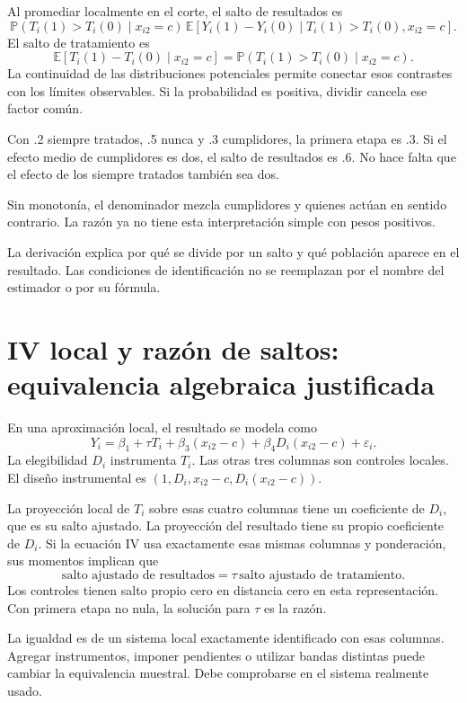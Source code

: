 \documentclass[11pt,a4paper]{article}
\newcommand{\E}{\mathbb E}
\newcommand{\Prob}{\mathbb P}
\begin{document}
Al promediar localmente en el corte,
el salto de resultados es
\[
\Prob(T_i(1)>T_i(0)\mid x_{i2}=c)
\,\E[Y_i(1)-Y_i(0)\mid T_i(1)>T_i(0),x_{i2}=c].
\]
El salto de tratamiento es
\[
\E[T_i(1)-T_i(0)\mid x_{i2}=c]
=\Prob(T_i(1)>T_i(0)\mid x_{i2}=c).
\]
La continuidad de las distribuciones
potenciales permite conectar esos
contrastes con los límites observables.
Si la probabilidad es positiva,
dividir cancela ese factor común.

\begin{ejemplo}[Composición]
Con .2 siempre tratados, .5 nunca
y .3 cumplidores, la primera etapa es .3.
Si el efecto medio de cumplidores es dos,
el salto de resultados es .6.
No hace falta que el efecto de los
siempre tratados también sea dos.
\end{ejemplo}
Sin monotonía, el denominador mezcla
cumplidores y quienes actúan en sentido contrario.
La razón ya no tiene esta
interpretación simple con pesos positivos.

La derivación explica por qué se
divide por un salto y qué
población aparece en el resultado.
Las condiciones de identificación no
se reemplazan por el nombre
del estimador o por su fórmula.

\clearpage
\section{IV local y razón de saltos: equivalencia algebraica justificada}\label{unidad44}
En una aproximación local, el resultado se modela como
\[
Y_i=\beta_1+\tau T_i+\beta_3(x_{i2}-c)
+\beta_4D_i(x_{i2}-c)+\varepsilon_i.
\]
La elegibilidad \(D_i\) instrumenta \(T_i\).
Las otras tres columnas son controles locales.
El diseño instrumental es
\((1,D_i,x_{i2}-c,D_i(x_{i2}-c))\).

La proyección local de \(T_i\) sobre
esas cuatro columnas tiene un coeficiente
de \(D_i\), que es su salto ajustado.
La proyección del resultado tiene
su propio coeficiente de \(D_i\).
Si la ecuación IV usa exactamente
esas mismas columnas y ponderación,
sus momentos implican que
\[
\text{salto ajustado de resultados}
=\tau\,\text{salto ajustado de tratamiento}.
\]
Los controles tienen salto propio cero
en distancia cero en esta representación.
Con primera etapa no nula,
la solución para \(\tau\) es la razón.

La igualdad es de un sistema local
exactamente identificado con esas columnas.
Agregar instrumentos, imponer pendientes
o utilizar bandas distintas puede
cambiar la equivalencia muestral.
Debe comprobarse en el sistema realmente usado.
\end{document}

